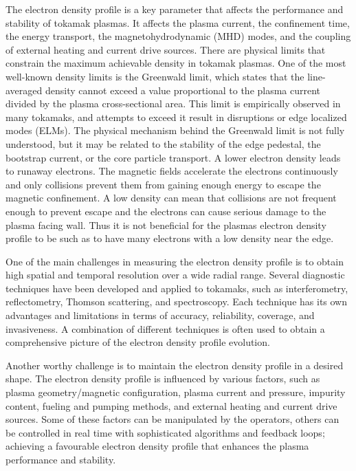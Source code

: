 The electron density profile is a key parameter that affects the performance and stability of tokamak plasmas. It affects the plasma current, the confinement time, the energy transport, the magnetohydrodynamic (MHD) modes, and the coupling of external heating and current drive sources. There are physical limits that constrain the maximum achievable density in tokamak plasmas. One of the most well-known density limits is the Greenwald limit, which states that the line-averaged density cannot exceed a value proportional to the plasma current divided by the plasma cross-sectional area. This limit is empirically observed in many tokamaks, and attempts to exceed it result in disruptions or edge localized modes (ELMs). The physical mechanism behind the Greenwald limit is not fully understood, but it may be related to the stability of the edge pedestal, the bootstrap current, or the core particle transport. A lower electron density leads to runaway electrons. The magnetic fields accelerate the electrons continuously and only collisions prevent them from gaining enough energy to escape the magnetic confinement. A low density can mean that collisions are not frequent enough to prevent escape and the electrons can cause serious damage to the plasma facing wall. Thus it is not beneficial for the plasmas electron density profile to be such as to have many electrons with a low density near the edge. 

One of the main challenges in measuring the electron density profile is to obtain high spatial and temporal resolution over a wide radial range. Several diagnostic techniques have been developed and applied to tokamaks, such as interferometry, reflectometry, Thomson scattering, and spectroscopy. Each technique has its own advantages and limitations in terms of accuracy, reliability, coverage, and invasiveness. A combination of different techniques is often used to obtain a comprehensive picture of the electron density profile evolution.

Another worthy challenge is to maintain the electron density profile in a desired shape. The electron density profile is influenced by various factors, such as plasma geometry/magnetic configuration, plasma current and pressure, impurity content, fueling and pumping methods, and external heating and current drive sources. Some of these factors can be manipulated by the operators, others can be controlled in real time with sophisticated algorithms and feedback loops; achieving a favourable electron density profile that enhances the plasma performance and stability.

